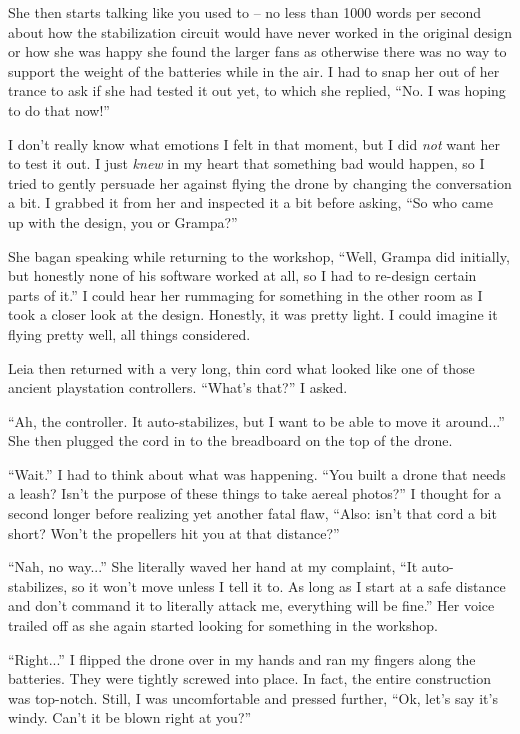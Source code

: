 She then starts talking like you used to -- no less than 1000 words per second about how the stabilization circuit would have never worked in the original design or how she was happy she found the larger fans as otherwise there was no way to support the weight of the batteries while in the air.
I had to snap her out of her trance to ask if she had tested it out yet, to which she replied, ``No. I was hoping to do that now!''

I don't really know what emotions I felt in that moment, but I did \textit{not} want her to test it out.
I just \textit{knew} in my heart that something bad would happen, so I tried to gently persuade her against flying the drone by changing the conversation a bit.
I grabbed it from her and inspected it a bit before asking, ``So who came up with the design, you or Grampa?''

She bagan speaking while returning to the workshop, ``Well, Grampa did initially, but honestly none of his software worked at all, so I had to re-design certain parts of it.''
I could hear her rummaging for something in the other room as I took a closer look at the design.
Honestly, it was pretty light.
I could imagine it flying pretty well, all things considered.

Leia then returned with a very long, thin cord what looked like one of those ancient playstation controllers.
``What's that?''
I asked.

``Ah, the controller. It auto-stabilizes, but I want to be able to move it around...'' She then plugged the cord in to the breadboard on the top of the drone.

``Wait.'' I had to think about what was happening. ``You built a drone that needs a leash? Isn't the purpose of these things to take aereal photos?''
I thought for a second longer before realizing yet another fatal flaw, ``Also: isn't that cord a bit short? Won't the propellers hit you at that distance?''

``Nah, no way...'' She literally waved her hand at my complaint, ``It auto-stabilizes, so it won't move unless I tell it to. As long as I start at a safe distance and don't command it to literally attack me, everything will be fine.''
Her voice trailed off as she again started looking for something in the workshop.

``Right...'' I flipped the drone over in my hands and ran my fingers along the batteries.
They were tightly screwed into place.
In fact, the entire construction was top-notch.
Still, I was uncomfortable and pressed further, ``Ok, let's say it's windy. Can't it be blown right at you?''

